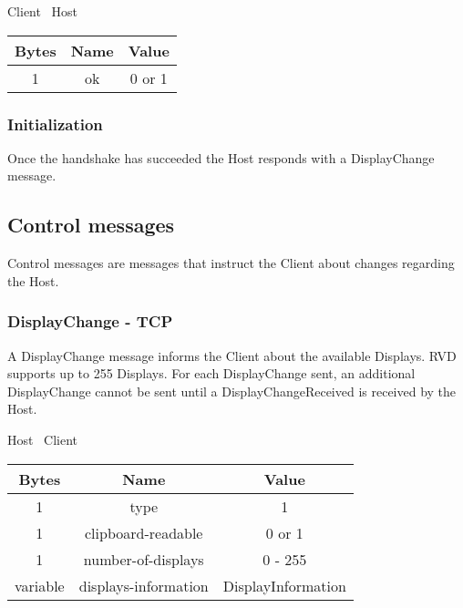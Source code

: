 \begin{center}
    Client \textrightarrow\ Host\\
    \begin{tabular}{|c|c|c|}
        \hline
        \textbf{Bytes} & \textbf{Name} & \textbf{Value} \\
        \hline
        1              & ok            & 0 or 1         \\
        \hline
    \end{tabular}
\end{center}

\subsubsection{Initialization}

Once the handshake has succeeded the Host responds with a DisplayChange message.

\subsection{Control messages}
Control messages are messages that instruct the Client about changes regarding the Host.

\subsubsection{DisplayChange - TCP}
A DisplayChange message informs the Client about the available Displays. RVD supports up to 255
Displays. For each DisplayChange sent, an additional DisplayChange cannot be sent until a DisplayChangeReceived is
received by the Host.

\begin{center}
    Host \textrightarrow\ Client\\
    \begin{tabular}{|c|c|c|}
        \hline
        \textbf{Bytes} & \textbf{Name}        & \textbf{Value}     \\
        \hline
        1              & type                 & 1                  \\
        \hline
        1              & clipboard-readable   & 0 or 1             \\
        \hline
        1              & number-of-displays   & 0 - 255            \\
        \hline
        variable       & displays-information & DisplayInformation \\
        \hline
    \end{tabular}
\end{center}

